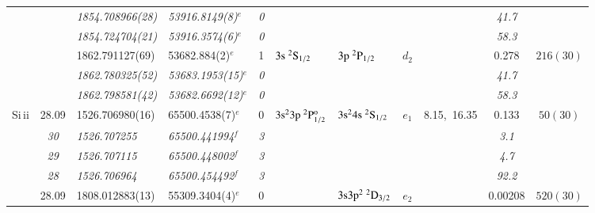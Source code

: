 \documentclass[useAMS,usenatbib]{mn2e}
\begin{document}
\begin{table*}
\begin{center}
\begin{minipage}{0.977\textwidth}
\begin{tabular}{lcllcllcccc}
              &        &\it{1854.708966(28)}& \it{53916.8149(8)}$^e$   &\it{0}&                                            &                                                    &        &              &\it{41.7}& $          $\\
              &        &\it{1854.724704(21)}& \it{53916.3574(6)}$^e$   &\it{0}&                                            &                                                    &        &              &\it{58.3}& $          $\\
              &        & 1862.791127(69)    & 53682.884(2)$^e$         & 1    & $3\rm{s}~^2\rm{S}_{1/2}$                   & $3\rm{p}~^2\rm{P}_{1/2}$                           & $d_2$  &              &  0.278  & $  216(30) $\\
              &        &\it{1862.780325(52)}& \it{53683.1953(15)}$^e$  &\it{0}&                                            &                                                    &        &              &\it{41.7}& $          $\\
              &        &\it{1862.798581(42)}& \it{53682.6692(12)}$^e$  &\it{0}&                                            &                                                    &        &              &\it{58.3}& $          $\\
Si{\sc \,ii}  & 28.09  & 1526.706980(16)    & 65500.4538(7)$^e$        & 0    & $3\rm{s}^23\rm{p}~^2\rm{P}_{1/2}^{\rm{o}}$ & $3\rm{s}^24\rm{s}~^2\rm{S}_{1/2}$                  & $e_1$  & 8.15,~16.35  &  0.133  & $   50(30) $\\
              & \it{30}&\it{1526.707255}    & \it{65500.441994}$^f$    &\it{3}&                                            &                                                    &        &              & \it{3.1}& $          $\\
              & \it{29}&\it{1526.707115}    & \it{65500.448002}$^f$    &\it{3}&                                            &                                                    &        &              & \it{4.7}& $          $\\
              & \it{28}&\it{1526.706964}    & \it{65500.454492}$^f$    &\it{3}&                                            &                                                    &        &              &\it{92.2}& $          $\\
              & 28.09  & 1808.012883(13)    & 55309.3404(4)$^e$        & 0    &                                            & $3\rm{s}3\rm{p}^2~^2\rm{D}_{3/2}$                  & $e_2$  &              &  0.00208& $  520(30) $\\

\end{tabular}
\end{minipage}
\end{center}
\end{table*}
\end{document}
